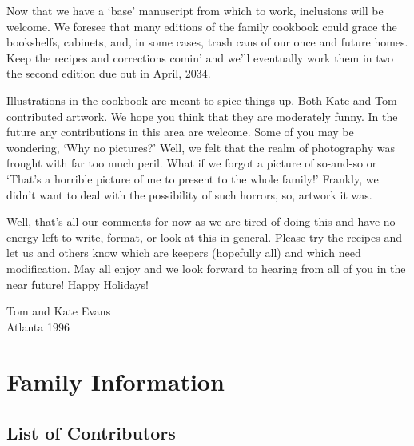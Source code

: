 \documentclass[12pt]{book}
\begin{document}
Now that we have a `base' manuscript from which to work, inclusions will
be welcome.  We foresee that many editions of the family cookbook could
grace the bookshelfs, cabinets, and, in some cases, trash cans of our
once and future homes.  Keep the recipes and corrections comin' and we'll
eventually work them in two the second edition due out in April, 2034.

Illustrations in the cookbook are meant to spice things up. Both Kate and
Tom contributed artwork.  We hope you think that they are moderately
funny.  In the future any contributions in this area are welcome.  Some
of you may be wondering, `Why no pictures?'  Well, we felt that the realm
of photography was frought with far too much peril.  What if we forgot a
picture of so-and-so or `That's a horrible picture of me to present to
the whole family!'  Frankly, we didn't want to deal with the possibility
of such horrors, so, artwork it was.

Well, that's all our comments for now as we are tired of doing this and
have no energy left to write, format, or look at this in general.  Please
try the recipes and let us and others know which are keepers (hopefully
all) and which need modification.  May all enjoy and we look forward to
hearing from all of you  in the near future!  Happy Holidays!

\vspace{.5in}
\begin{flushright}
Tom and Kate Evans\\ Atlanta 1996
\end{flushright}

\mainmatter







\backmatter

\chapter{Family Information}

\section{List of Contributors}
\end{document}
